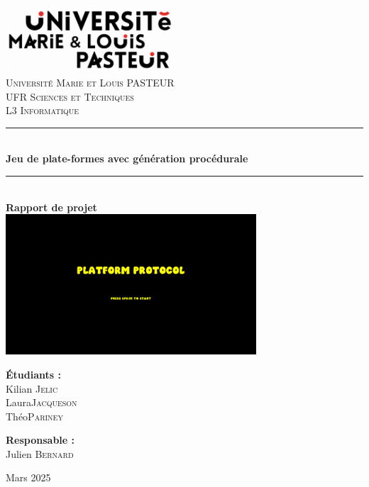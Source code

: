 \documentclass[10pt]{report}
\newcommand{\HRule}{\rule{\linewidth}{0.5mm}}
\begin{document}
\begin{titlepage}
  \begin{center}
    \includegraphics[height=25mm]{gfx/logo-UMLP} \\[1cm]
    

    {\LARGE\textsc{Université Marie et Louis PASTEUR}}\\[0.4cm]
    {\Large\textsc{UFR Sciences et Techniques}}\\[0.4cm]
    {\Large \textsc{L3 Informatique}}\\[1cm]
    

    \HRule \\[0.5cm]
    {\huge \bfseries Jeu de plate-formes avec génération procédurale}\\[0.4cm]
    \HRule \\[1cm]

    {\Large \textbf{Rapport de projet}}\\[1cm]

    \includegraphics[width=0.7\textwidth]{images/illustration} \\[1.5cm]

    \parbox{0.45\textwidth}{\raggedright
      \textbf{Étudiants :} \\
      Kilian \textsc{Jelic}\\
      Laura\textsc{Jacqueson}\\
      Théo\textsc{Pariney}
    }
    \hfill
    \parbox{0.45\textwidth}{\raggedleft
      \textbf{Responsable :}\\
      Julien \textsc{Bernard}
    }
    \vfill

    {\large Mars 2025}

  \end{center}
\end{titlepage}
\end{document}
